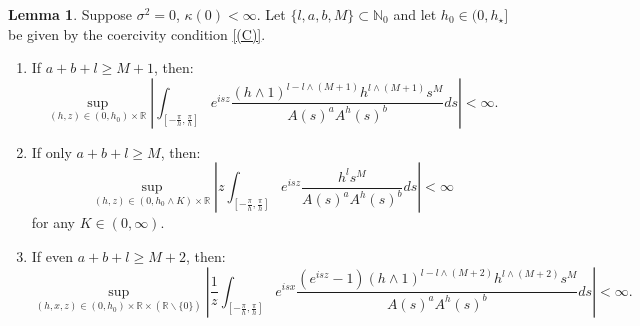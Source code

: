\documentclass[pdftex,oneside,11pt,reqno]{amsart}
\theoremstyle{definition}
\theoremstyle{theorem}
\newtheorem{lemma}{Lemma}[section]
\theoremstyle{remark}
\numberwithin{equation}{section}
\numberwithin{definition}{section}
\begin{document}
\begin{lemma}\label{lemma:FV}
Suppose ${\sigma^2}=0$, $\kappa(0)<\infty$. Let $\{l,a,b,M\}\subset \mathbb{N}_0$ and let $h_0\in (0,h_\star]$ be given by the coercivity condition \ref{(C)}.

\begin{enumerate}
\item\label{lemma:FV:one} If $a+b+l\geq M+1$, then: $$\sup_{(h,z)\in (0,h_0)\times \mathbb{R}}\left\vert \int_{[-\frac{\pi}{h},\frac{\pi}{h}]}e^{isz}\frac{(h\land 1)^{l-l\land (M+1)}h^{l\land (M+1)}s^M}{A(s)^{a}A^h(s)^{b}}ds\right\vert<\infty.$$
\item\label{lemma:FV:two} If only $a+b+l\geq M$, then: $$\sup_{(h,z)\in (0,h_0\land K)\times \mathbb{R}}\left\vert z \int_{[-\frac{\pi}{h},\frac{\pi}{h}]}e^{isz}\frac{h^ls^M}{A(s)^{a}A^h(s)^{b}}ds\right\vert<\infty$$ for any $K\in (0,\infty)$.
\item\label{lemma:FV:three} If even $a+b+l\geq M+2$, then: $$\sup_{(h,x,z)\in (0,h_0)\times \mathbb{R}\times (\mathbb{R}\backslash \{0\})}\left\vert\frac{1}{z } \int_{[-\frac{\pi}{h},\frac{\pi}{h}]}e^{isx}\frac{(e^{isz}-1)(h\land 1)^{l-l\land (M+2)}h^{l\land (M+2)}s^M}{A(s)^{a}A^h(s)^{b}}ds\right\vert<\infty.$$ 
\end{enumerate}
\end{lemma}
\end{document}
